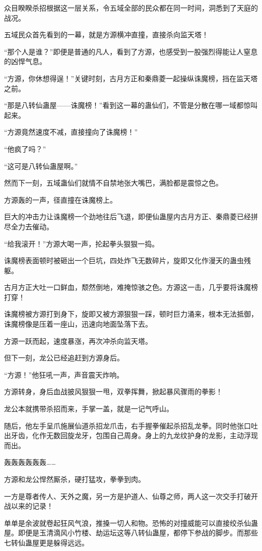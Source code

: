 \begin{this_body}
众目睽睽杀招根据这一层关系，令五域全部的民众都在同一时间，洞悉到了天庭的战况。

五域民众首先看到的一幕，就是方源横冲直撞，直接杀向监天塔！

“那个人是谁？”即便是普通的凡人，看到了方源，也感受到一股强烈得能让人窒息的凶悍气息。

“方源，你休想得逞！”关键时刻，古月方正和秦鼎菱一起操纵诛魔榜，挡在监天塔之前。

“那是八转仙蛊屋——诛魔榜！”看到这一幕的蛊仙们，不管是分散在哪一域都惊叫起来。

“方源竟然速度不减，直接撞向了诛魔榜！”

“他疯了吗？”

“这可是八转仙蛊屋啊。”

然而下一刻，五域蛊仙们就情不自禁地张大嘴巴，满脸都是震惊之色。

方源轰的一声，径直撞在诛魔榜上。

巨大的冲击力让诛魔榜一个劲地往后飞退，即便仙蛊屋内古月方正、秦鼎菱已经拼尽全力去催动。

“给我滚开！”方源大喝一声，抡起拳头狠狠一捣。

诛魔榜表面顿时被砸出一个巨坑，四处炸飞无数碎片，旋即又化作漫天的蛊虫残躯。

古月方正大吐一口鲜血，颓然倒地，难掩惊骇之色。方源这一击，几乎要将诛魔榜打穿！

诛魔榜被方源打到身下，旋即又被方源狠狠一踩，顿时巨力涌来，根本无法抵御，诛魔榜像是压着一座山，迅速向地面坠落下去。

方源一跃而起，速度暴涨，再次冲杀向监天塔。

但下一刻，龙公已经追赶到方源身后。

“方源！”他狂吼一声，声音震天炸响。

方源转身，身后血战披风狠狠一甩，双拳挥舞，掀起暴风骤雨的拳影！

龙公本就携带杀招而来，手掌一盖，就是一记气呼山。

随后，他左手呈爪施展仙道杀招龙爪击，右手握拳催起杀招乱龙拳。同时他张口吐出牙齿，化作无数回旋龙牙，包围自己周身。身上的九龙纹护身的龙影，主动浮现而出。

轰轰轰轰轰轰……

方源和龙公悍然厮杀，硬打猛攻，拳拳到肉。

一方是尊者传人、天外之魔，另一方是护道人、仙尊之师，两人这一次交手打破开战以来的记录！

单单是余波就卷起狂风气浪，推搡一切人和物。恐怖的对撞威能可以直接绞杀仙蛊屋。即便是玉清滴风小竹楼、劫运坛这等八转仙蛊屋，都停下参战的脚步。而那些七转仙蛊屋更是躲得远远。


\end{this_body}
